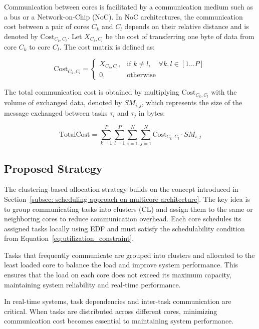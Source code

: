 \documentclass[conference]{IEEEtran}
\begin{document}
Communication between cores is facilitated by a communication medium such as a bus or a Network-on-Chip (NoC). In NoC architectures, the communication cost between a pair of cores $C_k$ and $C_l$ depends on their relative distance and is denoted by $\text{Cost}_{C_k,C_l}$. Let $X_{C_k,C_l}$ be the cost of transferring one byte of data from core $C_k$ to core $C_l$. The cost matrix is defined as:

\begin{equation}
\text{Cost}_{C_k, C_l} =
\begin{cases}
X_{C_k, C_l}, & \text{if } k \ne l,\quad \forall k, l \in [1 \ldots P] \\
0, & \text{otherwise}
\end{cases}
\label{eq:cost_function}
\end{equation}

The total communication cost is obtained by multiplying $\text{Cost}_{C_k,C_l}$ with the volume of exchanged data, denoted by $SM_{i,j}$, which represents the size of the message exchanged between tasks $\tau_i$ and $\tau_j$ in bytes:

\begin{equation}
\text{TotalCost} = \sum_{k=1}^{P} \sum_{l=1}^{P} \sum_{i=1}^{N} \sum_{j=1}^{N} \text{Cost}_{C_k, C_l} \cdot SM_{i,j}
\label{eq:total_cost}
\end{equation}

\subsection{Proposed Strategy}
\label{subsec: proposed strategy}

The clustering-based allocation strategy builds on the concept introduced in Section~\ref{subsec: scheduling approach on multicore architecture}. The key idea is to group communicating tasks into clusters (CL) and assign them to the same or neighboring cores to reduce communication overhead. Each core schedules its assigned tasks locally using EDF and must satisfy the schedulability condition from Equation~\ref{eq:utilization_constraint}.

Tasks that frequently communicate are grouped into clusters and allocated to the least loaded core to balance the load and improve system performance. This ensures that the load on each core does not exceed its maximum capacity, maintaining system reliability and real-time performance.

In real-time systems, task dependencies and inter-task communication are critical. When tasks are distributed across different cores, minimizing communication cost becomes essential to maintaining system performance.
\end{document}
